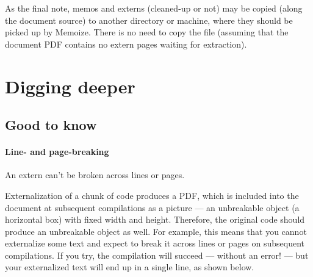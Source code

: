 \documentclass[a4paper,11pt]{article}
\begin{document}

As the final note, memos and externs (cleaned-up or not) may be copied (along
the document source) to another directory or machine, where they should be
picked up by Memoize.  There is no need to copy the \dmmz file (assuming that
the document PDF contains no extern pages waiting for extraction).


\section{Digging deeper}
\label{sec:potential-pitfalls}



\subsection{Good to know}
\label{sec:tut:good-to-know}


\paragraph{Line- and page-breaking} An extern can't be broken across lines or
pages.

Externalization of a chunk of code produces a PDF, which is included into the
document at subsequent compilations as a picture --- an unbreakable object (a
horizontal box) with fixed width and height.  Therefore, the original code
should produce an unbreakable object as well.  For example, this means that you
cannot externalize some text and expect  to break it across lines
or pages on subsequent compilations.  If you try, the compilation will succeed
--- without an error!  --- but your externalized text will end up in a single
line, as shown below.
\end{document}
